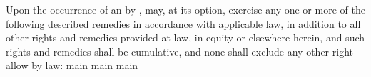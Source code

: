 \blankspace
Upon the occurrence of an \eventOfDefault by \lessee, \lessor may, at its option, exercise any one or more of the following described remedies in accordance with applicable law, in addition to all other rights and remedies provided at law, in equity or elsewhere herein, and such rights and remedies shall be cumulative, and none shall exclude any other right allow by law:
{main}
{main}
{main}
